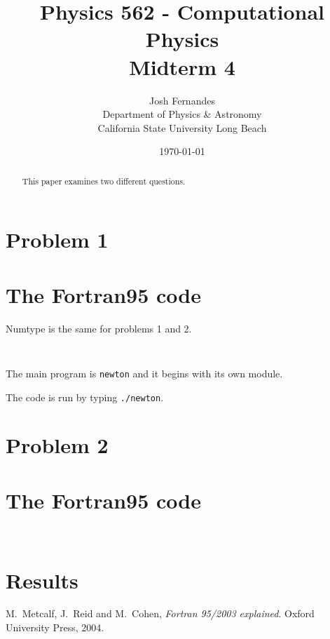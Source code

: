 \documentclass[12pt]{article}
\begin{document}




\title{Physics 562 - Computational Physics\\[.5cm]
Midterm 4}
\author{Josh Fernandes\\
Department of Physics \& Astronomy\\
California State University Long Beach}
\date{\today}

  
\maketitle



\begin{abstract}
This paper examines two different questions. 
\end{abstract}


\section{Problem 1}

\section{The Fortran95 code}

Numtype is the same for problems 1 and 2. 
\begin{lstlisting}[frame=single,caption={Module {\tt NumType}},label=module]


\end{lstlisting}

The main program is {\tt newton} and it begins with its own module. 


The code is run by typing {\tt ./newton}.

\section{Problem 2}



\section{The Fortran95 code}

\begin{lstlisting}[frame=single,caption={ {\tt mtestthisone.f95}},label=module]


\end{lstlisting}



\section{Results}





\begin{thebibliography}{}


 M.\ Metcalf, J.\ Reid and M.\ Cohen, {\it Fortran 95/2003 explained}. Oxford University Press, 2004.
 

\end{thebibliography}
\end{document}
